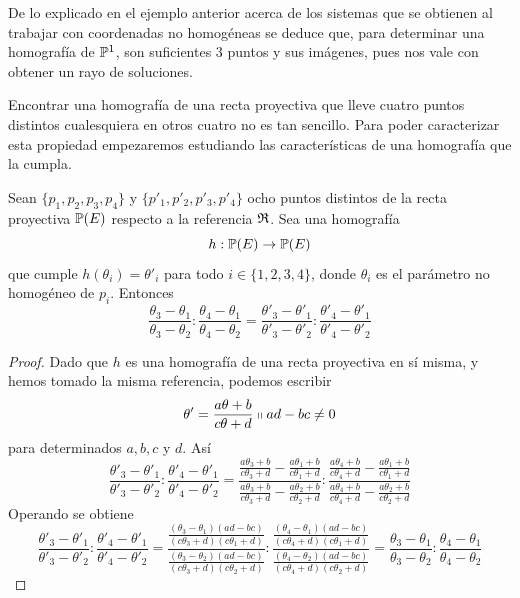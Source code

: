 \begin{obs}
	De lo explicado en el ejemplo anterior acerca de los sistemas que se obtienen al trabajar con coordenadas no homogéneas se deduce que, para determinar una homografía de $\mathbb{P}^1$, son suficientes $3$ puntos y sus imágenes, pues nos vale con obtener un rayo de soluciones.
\end{obs}
Encontrar una homografía de una recta proyectiva que lleve cuatro puntos distintos cualesquiera en otros cuatro no es tan sencillo. Para poder caracterizar esta propiedad empezaremos estudiando las características de una homografía que la cumpla.
\begin{lem}
	Sean $\{p_1,p_2,p_3,p_4\}$ y $\{p'_1,p'_2,p'_3,p'_4\}$ ocho puntos distintos de la recta proyectiva $\mathbb{P}(E)$ respecto a la referencia $\mathfrak{R}$. Sea una homografía
	\[h:\mathbb{P}(E)\rightarrow \mathbb{P}(E)\]
	que cumple $h(\theta_i)=\theta'_i$ para todo $i\in\{1,2,3,4\}$, donde $\theta_i$ es el parámetro no homogéneo de $p_i$. Entonces
	\begin{equation}
		\frac{\theta_3-\theta_1}{\theta_3-\theta_2}:\frac{\theta_4-\theta_1}{\theta_4-\theta_2}=\frac{\theta'_3-\theta'_1}{\theta'_3-\theta'_2}:\frac{\theta'_4-\theta'_1}{\theta'_4-\theta'_2}
	\end{equation}
\end{lem}
\begin{proof}
	Dado que $h$ es una homografía de una recta proyectiva en sí misma, y hemos tomado la misma referencia, podemos escribir
	\begin{equation*}
		\theta'=\frac{a\theta+b}{c\theta +d}\shortparallel ad-bc\not=0
	\end{equation*}
	para determinados $a,b,c$ y $d$. Así
	\begin{equation*}
		\frac{\theta'_3-\theta'_1}{\theta'_3-\theta'_2}:\frac{\theta'_4-\theta'_1}{\theta'_4-\theta'_2}=\frac{\frac{a\theta_3+b}{c\theta_3 +d}-\frac{a\theta_1+b}{c\theta_1 +d}}{\frac{a\theta_3+b}{c\theta_3 +d}-\frac{a\theta_2+b}{c\theta_2 +d}}:\frac{\frac{a\theta_4+b}{c\theta_4 +d}-\frac{a\theta_1+b}{c\theta_1 +d}}{\frac{a\theta_4+b}{c\theta_4 +d}-\frac{a\theta_2+b}{c\theta_2+d}}
	\end{equation*}
	Operando se obtiene
	\begin{equation*}
		\frac{\theta'_3-\theta'_1}{\theta'_3-\theta'_2}:\frac{\theta'_4-\theta'_1}{\theta'_4-\theta'_2}=\frac{\frac{(\theta_3-\theta_1)(ad-bc)}{(c\theta_3+d)(c\theta_1+d)}}{\frac{(\theta_3-\theta_2)(ad-bc)}{(c\theta_3+d)(c\theta_2+d)}}:\frac{\frac{(\theta_4-\theta_1)(ad-bc)}{(c\theta_4+d)(c\theta_1+d)}}{\frac{(\theta_4-\theta_2)(ad-bc)}{(c\theta_4+d)(c\theta_2+d)}}=\frac{\theta_3-\theta_1}{\theta_3-\theta_2}:\frac{\theta_4-\theta_1}{\theta_4-\theta_2}
	\end{equation*}
\end{proof}
